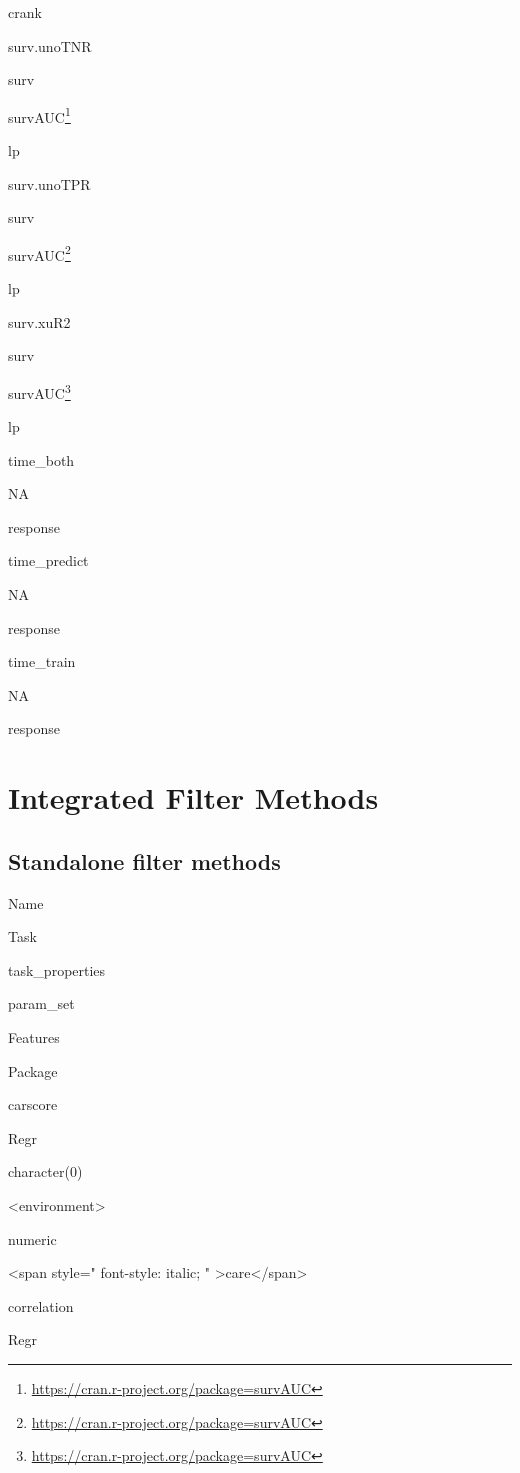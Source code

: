 \documentclass[12pt,]{scrbook}
\renewcommand{\href}[2]{#2\footnote{\url{#1}}}
\begin{document}
crank

surv.unoTNR

surv

\href{https://cran.r-project.org/package=survAUC}{survAUC}

lp

surv.unoTPR

surv

\href{https://cran.r-project.org/package=survAUC}{survAUC}

lp

surv.xuR2

surv

\href{https://cran.r-project.org/package=survAUC}{survAUC}

lp

time\_both

NA

response

time\_predict

NA

response

time\_train

NA

response

\hypertarget{list-filters}{%
\section{Integrated Filter Methods}\label{list-filters}}

\hypertarget{fs-filter-list}{%
\subsection{Standalone filter methods}\label{fs-filter-list}}

Name

Task

task\_properties

param\_set

Features

Package

carscore

Regr

character(0)

\textless{}environment\textgreater{}

numeric

\textless{}span style=" font-style: italic; " \textgreater{}care\textless{}/span\textgreater{}

correlation

Regr
\end{document}
